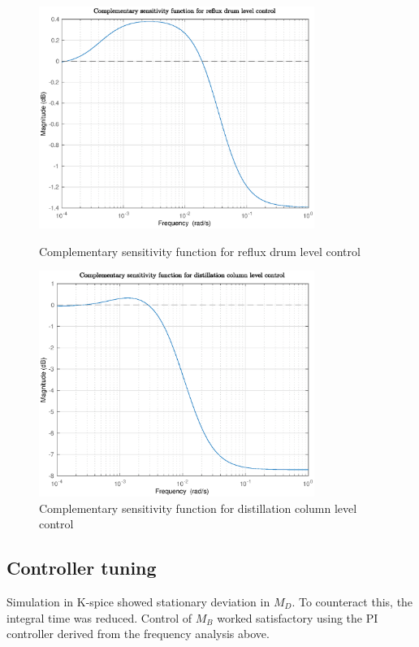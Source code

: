 \documentclass[12pt]{article}
\begin{document}
\begin{figure}
\centering
\includegraphics[width=0.8\textwidth]{../Systemanalyse/Log_Data_to_Matlab/Figurer/DB_tuning/T1.eps}
\caption{Complementary sensitivity function for reflux drum level control}
\label{fig:T1}

\includegraphics[width=0.8\textwidth]{../Systemanalyse/Log_Data_to_Matlab/Figurer/DB_tuning/T2.eps}
\caption{Complementary sensitivity function for distillation column level control}
\label{fig:T2}
\end{figure}

\subsection{Controller tuning}
Simulation in K-spice showed stationary deviation in $M_D$. To counteract this, the integral time was reduced. Control of $M_B$ worked satisfactory using the PI controller derived from the frequency analysis above.
\end{document}
